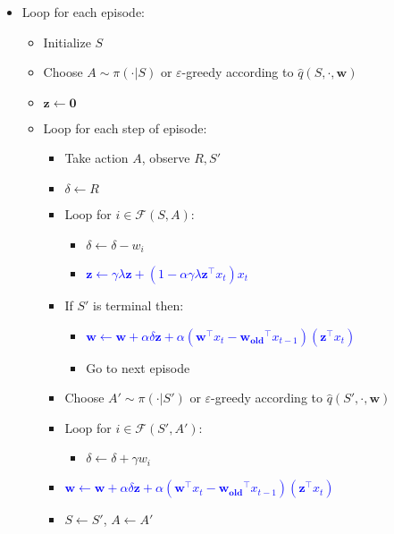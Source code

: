{\begin{minipage}{0.95\textwidth}
    \begin{itemize}[left=0em]
        \item[] Loop for each episode:
        \begin{itemize}[left=0em]
            \item[] Initialize $S$
            \item[] Choose $A \sim \pi(\cdot|S)$ or $\varepsilon$-greedy according to $\hat{q}(S, \cdot, \mathbf{w})$
            \item[] $\mathbf{z} \gets \mathbf{0}$
            \item[] Loop for each step of episode:
            \begin{itemize}[left=0em]
                \item[] Take action $A$, observe $R, S'$
                \item[] $\delta \gets R$
                \item[] Loop for $i \in \mathcal{F}(S,A)$:
                \begin{itemize}[left=0em]
                    \item[] $\delta \gets \delta - w_i$
                    \item[] \textcolor{blue}{$\mathbf{z} \gets \gamma \lambda \mathbf{z} + (1 - \alpha \gamma \lambda \mathbf{z}^\top x_t) x_t$}
                \end{itemize}
                \item[] If $S'$ is terminal then:
                \begin{itemize}[left=0em]
                    \item[] \textcolor{blue}{$\mathbf{w} \gets \mathbf{w} + \alpha \delta \mathbf{z} + \alpha (\mathbf{w}^\top x_t - \mathbf{w_{old}}^\top x_{t-1}) (\mathbf{z}^\top x_t) $}
                    \item[] Go to next episode
                \end{itemize}
                \item[] Choose $A' \sim \pi(\cdot|S')$ or $\varepsilon$-greedy according to $\hat{q}(S', \cdot, \mathbf{w})$
                \item[] Loop for $i \in \mathcal{F}(S',A')$:
                \begin{itemize}[left=0em]
                    \item[] $\delta \gets \delta + \gamma w_i$
                \end{itemize}
                \item[] \textcolor{blue}{$\mathbf{w} \gets \mathbf{w} + \alpha \delta \mathbf{z} + \alpha (\mathbf{w}^\top x_t - \mathbf{w_{old}}^\top x_{t-1}) (\mathbf{z}^\top x_t) $}
                \item[] $S \gets S'$, $A \gets A'$
            \end{itemize}
        \end{itemize}
    \end{itemize}
\end{minipage}
}

